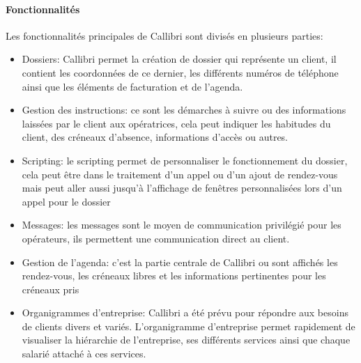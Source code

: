 \paragraph{Fonctionnalités \newline}
Les fonctionnalités principales de \gls{Callibri} sont divisés en plusieurs parties: \newline
\begin{itemize}
    \item Dossiers: \gls{Callibri} permet la création de dossier qui représente un client,
    il contient les coordonnées de ce dernier, les différents numéros de téléphone ainsi que les éléments
    de facturation et de l'agenda. \newline

    \item Gestion des instructions: ce sont les démarches 
    à suivre ou des informations laissées par le client aux opératrices, cela peut indiquer les habitudes du client, 
    des créneaux d'absence, informations d'accès ou autres. \newline 


    \item Scripting: le scripting permet de personnaliser le fonctionnement du dossier,
    cela peut être dans le traitement d'un appel ou d'un ajout de rendez-vous mais
    peut aller aussi jusqu'à l'affichage de fenêtres personnalisées lors d'un appel pour le dossier 
    \newline
    
    \item Messages: les messages sont le moyen de communication privilégié pour les opérateurs,
    ils permettent une communication direct au client.
    \newline

    \item Gestion de l'agenda: c'est la partie centrale de \gls{Callibri} ou sont affichés les rendez-vous,
    les créneaux libres et les informations pertinentes pour les créneaux pris
    \newline
    
    \item Organigrammes d'entreprise: \gls{Callibri} a été prévu pour répondre 
    aux besoins de clients divers et variés. L'organigramme d'entreprise permet rapidement
     de visualiser la hiérarchie de l'entreprise, ses différents services ainsi 
     que chaque salarié attaché à ces services. \newline
\end{itemize}



